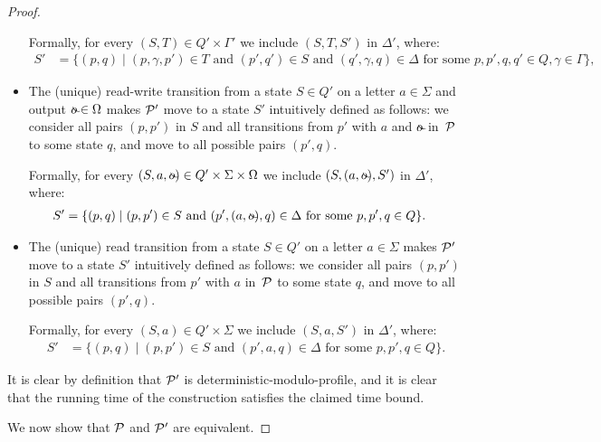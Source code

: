 \begin{proof}
\begin{itemize}
                  Formally, 
                  for every $(S, T)\in Q'\times\Gamma'$ we include $(S, T, S')$ in $\Delta'$, where:
                  {\small
		\begin{align*}
			S' &= \{(p,q)\mid(p,\gamma,p')\in T\text{ and }(p',q')\in S\text{ and }(q',\gamma,q)\in\Delta \text{ for some }p,p',q,q'\in Q,\gamma\in\Gamma\},
		\end{align*}
                }

              \item The (unique) read-write transition from a state $S \in Q'$ on a letter
                  $a \in \Sigma$ and output $\oout \in \Omega$ makes
                  $\mathcal{P}'$ move to a state $S'$ intuitively defined as follows: we
                  consider all pairs $(p, p')$ in $S$ and all transitions from
                  $p'$ with $a$ and $\oout$ in~$\mathcal{P}$ to some state $q$, and
                  move to all possible pairs $(p', q)$.

                  Formally, for every $(S, a, \oout)\in Q'\times\Sigma\times\Omega$ we include $(S, (a, \oout), S')$ in $\Delta'$, where:
		\begin{align*}
			S' &= \{(p,q)\mid (p,p')\in S\text{ and }	(p',(a,\oout),q)\in\Delta\text{ for some }p,p',q\in Q\}.
		\end{align*}
	 \item The (unique) read transition from a state $S \in Q'$ on a letter
	$a \in \Sigma$ makes
	$\mathcal{P}'$ move to a state $S'$ intuitively defined as follows: we
	consider all pairs $(p, p')$ in $S$ and all transitions from
	$p'$ with $a$ in~$\mathcal{P}$ to some state $q$, and
	move to all possible pairs $(p', q)$.
	
	Formally, for every $(S, a)\in Q'\times\Sigma$ we include $(S, a, S')$ in $\Delta'$, where:
	\begin{align*}
		S' &= \{(p,q)\mid (p,p')\in S\text{ and }	(p',a,q)\in\Delta\text{ for some }p,p',q\in Q\}.
	\end{align*}
	\end{itemize}

        It is clear by definition that $\mathcal{P}'$ is deterministic-modulo-profile,
        and it is clear that the running time of the construction satisfies the
        claimed time bound.

        We now show that $\mathcal{P}$ and $\mathcal{P}'$ are equivalent.


\end{proof}
